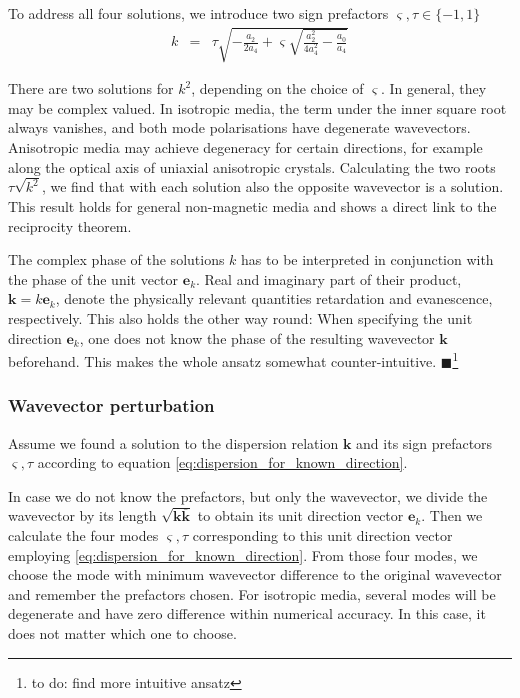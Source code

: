 \documentclass[12pt,a4paper,twoside,openright,BCOR10mm,headsepline,titlepage,abstracton,chapterprefix,final]{scrreprt}
\newcommand\Vector[1]{{\mathbf{#1}}}
\newcommand\wavenumber{k}
\newcommand\Wavevector{\Vector{\wavenumber}}
\newcommand{\remark}[1]{{\color{red}$\blacksquare$}\footnote{{\color{red}#1}}}
\begin{document}
To address all four solutions, we introduce two sign prefactors $\varsigma, \tau \in \{ -1,1\}$
\begin{eqnarray}
 \wavenumber &=& \tau \sqrt{ - \frac{a_2}{2 a_4} + \varsigma \sqrt{\frac{a_2^2}{4 a_4^2} - \frac{a_0}{a_4}} } \label{eq:dispersion_for_known_direction}
\end{eqnarray}

There are two solutions for $\wavenumber^2$, depending on the choice of $\varsigma$.
In general, they may be complex valued.
In isotropic media, the term under the inner square root always vanishes, and both mode polarisations have degenerate wavevectors.
Anisotropic media may achieve degeneracy for certain directions, 
for example along the optical axis of uniaxial anisotropic crystals.
Calculating the two roots $\tau \sqrt{\wavenumber^2}$, we find that with each solution
also the opposite wavevector is a solution.
This result holds for general non-magnetic media and shows a direct link to the reciprocity theorem.

The complex phase of the solutions $\wavenumber$ has to be interpreted
in conjunction with the phase of the unit vector $\Vector{e}_\wavenumber$.
Real and imaginary part of their product, $\Wavevector = \wavenumber \Vector{e}_\wavenumber$, 
denote the physically relevant quantities retardation and evanescence, respectively.
This also holds the other way round: When specifying the unit direction $\Vector{e}_\wavenumber$, 
one does not know the phase of the resulting wavevector $\Wavevector$ beforehand.
This makes the whole ansatz somewhat counter-intuitive.
\remark{to do: find more intuitive ansatz}

\subsubsection{Wavevector perturbation}

Assume we found a solution to the dispersion relation $\Wavevector$ and its sign prefactors $\varsigma, \tau$ according to equation \eqref{eq:dispersion_for_known_direction}.

In case we do not know the prefactors, but only the wavevector, we divide the wavevector by its length $\sqrt{\Wavevector \overline{\Wavevector}}$ 
to obtain its unit direction vector $\Vector{e}_\wavenumber$. 
Then we calculate the four modes $\varsigma, \tau$ corresponding to this unit direction vector employing \eqref{eq:dispersion_for_known_direction}.
From those four modes, we choose the mode with minimum wavevector difference to the original wavevector and remember the prefactors chosen.
For isotropic media, several modes will be degenerate and have zero difference within numerical accuracy.
In this case, it does not matter which one to choose.
\end{document}
